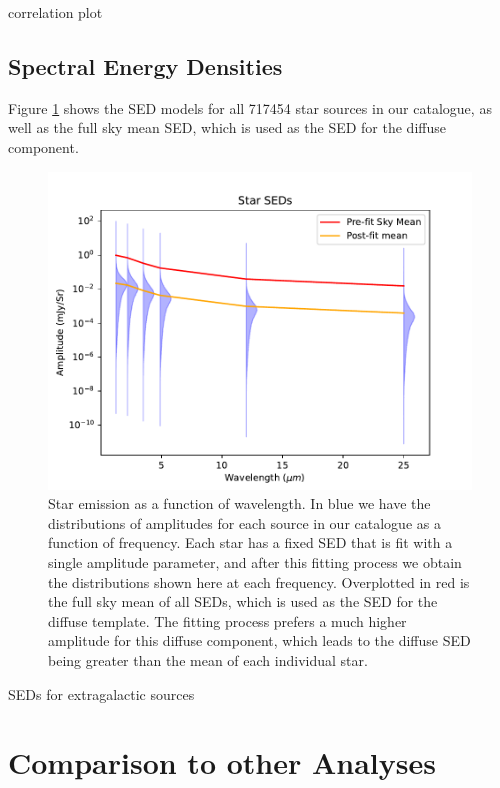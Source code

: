 \documentclass{aa}
\begin{document}
correlation plot

\subsection{Spectral Energy Densities}

Figure \ref{fig:starSEDs} shows the SED models for all 717454 star sources in our catalogue, as well as the full sky mean SED, which is used as the SED for the diffuse component. 

\begin{figure}
  \includegraphics[width=\columnwidth]{figs/starseds/star_seds.pdf}
  \caption{Star emission as a function of wavelength. In blue we have the distributions of amplitudes for each source in our catalogue as a function of frequency. Each star has a fixed SED that is fit with a single amplitude parameter, and after this fitting process we obtain the distributions shown here at each frequency. Overplotted in red is the full sky mean of all SEDs, which is used as the SED for the diffuse template. The fitting process prefers a much higher amplitude for this diffuse component, which leads to the diffuse SED being greater than the mean of each individual star.}
  \label{fig:starSEDs}
\end{figure}

SEDs for extragalactic sources


\section{Comparison to other Analyses}
\label{sec:consistency}
\end{document}
